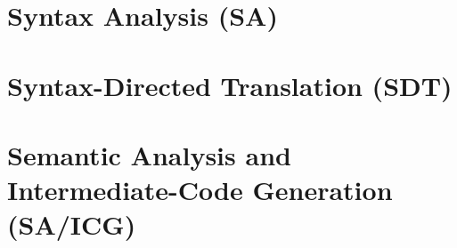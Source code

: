 \documentclass{wileySev}
\begin{document}
        \chapter[Syntax Analysis (SA)]
        {Syntax Analysis (SA)}

        \chapter[Syntax-Directed Translation (SDT)]
        {Syntax-Directed Translation (SDT)}

        \chapter[Semantic Analysis and Intermediate-Code Generation (SA/ICG)]
        {Semantic Analysis and Intermediate-Code Generation (SA/ICG)}
\end{document}
